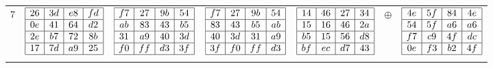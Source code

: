 \begin{longtable}{c c c c c c c}
  7 & 
  $\begin{array}{|c|c|c|c|}
    \hline
    26 & 3d & e8 & fd \\ \hline
    0e & 41 & 64 & d2 \\ \hline
    2e & b7 & 72 & 8b \\ \hline
    17 & 7d & a9 & 25 \\ \hline
  \end{array}$ &
  $\begin{array}{|c|c|c|c|}
    \hline
    f7 & 27 & 9b & 54 \\ \hline
    ab & 83 & 43 & b5 \\ \hline
    31 & a9 & 40 & 3d \\ \hline
    f0 & ff & d3 & 3f \\ \hline
  \end{array}$ &
  $\begin{array}{|c|c|c|c|}
    \hline
    f7 & 27 & 9b & 54 \\ \hline
    83 & 43 & b5 & ab \\ \hline
    40 & 3d & 31 & a9 \\ \hline
    3f & f0 & ff & d3 \\ \hline
  \end{array}$ &
  $\begin{array}{|c|c|c|c|}
    \hline
    14 & 46 & 27 & 34 \\ \hline
    15 & 16 & 46 & 2a \\ \hline
    b5 & 15 & 56 & d8 \\ \hline
    bf & ec & d7 & 43 \\ \hline
  \end{array}$ &
  $\oplus$ &
  $\begin{array}{|c|c|c|c|}
    \hline
    4e & 5f & 84 & 4e \\ \hline
    54 & 5f & a6 & a6 \\ \hline
    f7 & c9 & 4f & dc \\ \hline
    0e & f3 & b2 & 4f \\ \hline
  \end{array}$ \\ \\
  

\end{longtable}

